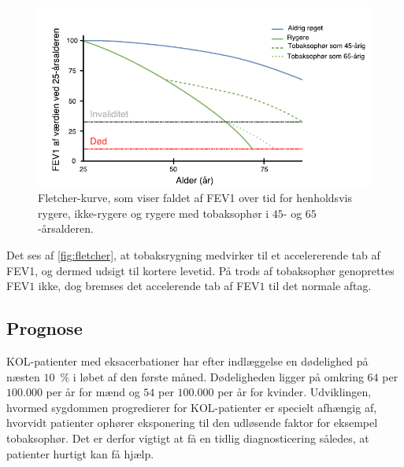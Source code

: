 \begin{figure} [H]
\centering
\includegraphics[width=1\textwidth]{figures/fletcher}
\caption{Fletcher-kurve, som viser faldet af FEV1 over tid for henholdsvis rygere, ikke-rygere og rygere med tobaksophør i $45$- og $65$-årsalderen.}
\label{fig:fletcher}
\end{figure} 

\noindent
Det ses af \autoref{fig:fletcher}, at tobaksrygning medvirker til et accelererende tab af FEV1, og dermed udsigt til kortere levetid. På trods af tobaksophør genoprettes FEV$1$ ikke, dog bremses det accelerende tab af FEV$1$ til det normale aftag.\cite{dsam2016}

\subsection{Prognose}
KOL-patienter med eksacerbationer har efter indlæggelse en dødelighed på næsten $10$~$\%$ i løbet af den første måned. Dødeligheden ligger på omkring $64$ per $100.000$ per år for mænd og $54$ per $100.000$ per år for kvinder.
Udviklingen, hvormed sygdommen progredierer for KOL-patienter er specielt afhængig af, hvorvidt patienter ophører eksponering til den udløsende faktor for eksempel tobaksophør. Det er derfor vigtigt at få en tidlig diagnosticering således, at patienter hurtigt kan få hjælp.\cite{dsam2016}

